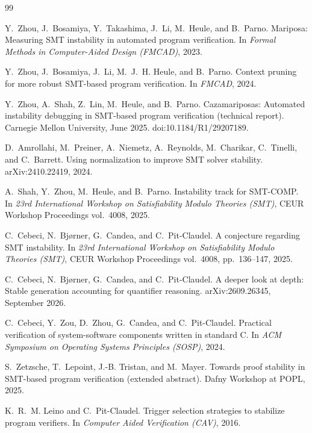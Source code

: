 \documentclass[11pt]{article}
\begin{document}
\begin{thebibliography}{99}\small

 Y.~Zhou, J.~Bosamiya, Y.~Takashima, J.~Li, M.~Heule, and B.~Parno. Mariposa: Measuring SMT instability in automated program verification. In \emph{Formal Methods in Computer-Aided Design (FMCAD)}, 2023.

 Y.~Zhou, J.~Bosamiya, J.~Li, M.~J.~H. Heule, and B.~Parno. Context pruning for more robust SMT-based program verification. In \emph{FMCAD}, 2024.

 Y.~Zhou, A.~Shah, Z.~Lin, M.~Heule, and B.~Parno. Cazamariposas: Automated instability debugging in SMT-based program verification (technical report). Carnegie Mellon University, June 2025. doi:10.1184/R1/29207189.

 D.~Amrollahi, M.~Preiner, A.~Niemetz, A.~Reynolds, M.~Charikar, C.~Tinelli, and C.~Barrett. Using normalization to improve SMT solver stability. arXiv:2410.22419, 2024.

 A.~Shah, Y.~Zhou, M.~Heule, and B.~Parno. Instability track for SMT-COMP. In \emph{23rd International Workshop on Satisfiability Modulo Theories (SMT)}, CEUR Workshop Proceedings vol.~4008, 2025.

 C.~Cebeci, N.~Bj{\o}rner, G.~Candea, and C.~Pit-Claudel. A conjecture regarding SMT instability. In \emph{23rd International Workshop on Satisfiability Modulo Theories (SMT)}, CEUR Workshop Proceedings vol.~4008, pp.~136--147, 2025.

 C.~Cebeci, N.~Bj{\o}rner, G.~Candea, and C.~Pit-Claudel. A deeper look at depth: Stable generation accounting for quantifier reasoning. arXiv:2609.26345, September 2026.

 C.~Cebeci, Y.~Zou, D.~Zhou, G.~Candea, and C.~Pit-Claudel. Practical verification of system-software components written in standard C. In \emph{ACM Symposium on Operating Systems Principles (SOSP)}, 2024.

 S.~Zetzsche, T.~Lepoint, J.-B. Tristan, and M.~Mayer. Towards proof stability in SMT-based program verification (extended abstract). Dafny Workshop at POPL, 2025.

 K.~R.~M. Leino and C.~Pit-Claudel. Trigger selection strategies to stabilize program verifiers. In \emph{Computer Aided Verification (CAV)}, 2016.


\end{thebibliography}
\end{document}
